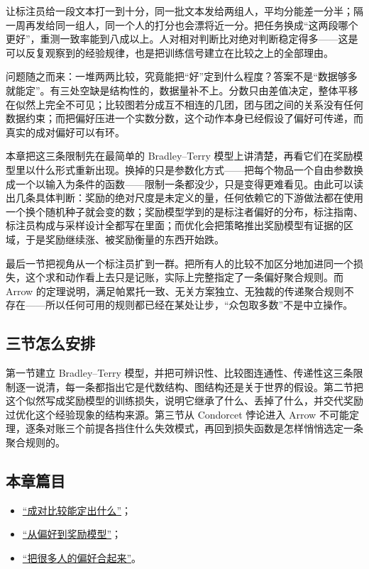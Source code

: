 让标注员给一段文本打一到十分，同一批文本发给两组人，平均分能差一分半；隔一周再发给同一组人，同一个人的打分也会漂将近一分。把任务换成``这两段哪个更好''，重测一致率能到八成以上。人对相对判断比对绝对判断稳定得多——这是可以反复观察到的经验规律，也是把训练信号建立在比较之上的全部理由。

问题随之而来：一堆两两比较，究竟能把``好''定到什么程度？答案不是``数据够多就能定''。有三处空缺是结构性的，数据量补不上。分数只由差值决定，整体平移在似然上完全不可见；比较图若分成互不相连的几团，团与团之间的关系没有任何数据约束；而把偏好压进一个实数分数，这个动作本身已经假设了偏好可传递，而真实的成对偏好可以有环。

本章把这三条限制先在最简单的 Bradley--Terry 模型上讲清楚，再看它们在奖励模型里以什么形式重新出现。换掉的只是参数化方式——把每个物品一个自由参数换成一个以输入为条件的函数——限制一条都没少，只是变得更难看见。由此可以读出几条具体判断：奖励的绝对尺度是未定义的量，任何依赖它的下游做法都在使用一个换个随机种子就会变的数；奖励模型学到的是标注者偏好的分布，标注指南、标注员构成与采样设计全都写在里面；而优化会把策略推出奖励模型有证据的区域，于是奖励继续涨、被奖励衡量的东西开始跌。

最后一节把视角从一个标注员扩到一群。把所有人的比较不加区分地加进同一个损失，这个求和动作看上去只是记账，实际上完整指定了一条偏好聚合规则。而 Arrow 的定理说明，满足帕累托一致、无关方案独立、无独裁的传递聚合规则不存在——所以任何可用的规则都已经在某处让步，``众包取多数''不是中立操作。

\subsection{三节怎么安排}

第一节建立 Bradley--Terry 模型，并把可辨识性、比较图连通性、传递性这三条限制逐一说清，每一条都指出它是代数结构、图结构还是关于世界的假设。第二节把这个似然写成奖励模型的训练损失，说明它继承了什么、丢掉了什么，并交代奖励过优化这个经验现象的结构来源。第三节从 Condorcet 悖论进入 Arrow 不可能定理，逐条对账三个前提各挡住什么失效模式，再回到损失函数是怎样悄悄选定一条聚合规则的。

\subsection{本章篇目}

\begin{itemize}
\tightlist
\item \hyperref[sec:17-Constrained-Guarantees/05-Learning-from-Comparisons/01]{``成对比较能定出什么''}；
\item \hyperref[sec:17-Constrained-Guarantees/05-Learning-from-Comparisons/02]{``从偏好到奖励模型''}；
\item \hyperref[sec:17-Constrained-Guarantees/05-Learning-from-Comparisons/03]{``把很多人的偏好合起来''}。
\end{itemize}

